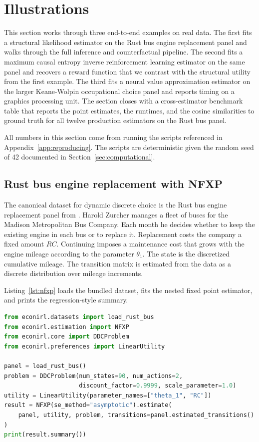 \section{Illustrations} \label{sec:illustrations}

This section works through three end-to-end examples on real data. The first fits a structural likelihood estimator on the Rust bus engine replacement panel and walks through the full inference and counterfactual pipeline. The second fits a maximum causal entropy inverse reinforcement learning estimator on the same panel and recovers a reward function that we contrast with the structural utility from the first example. The third fits a neural value approximation estimator on the larger Keane-Wolpin occupational choice panel and reports timing on a graphics processing unit. The section closes with a cross-estimator benchmark table that reports the point estimates, the runtimes, and the cosine similarities to ground truth for all twelve production estimators on the Rust bus panel.

All numbers in this section come from running the scripts referenced in Appendix~\ref{app:reproducing}. The scripts are deterministic given the random seed of 42 documented in Section~\ref{sec:computational}.

\subsection{Rust bus engine replacement with NFXP} \label{sec:illustrations:nfxp}

The canonical dataset for dynamic discrete choice is the Rust bus engine replacement panel from \citet{rust1987}. Harold Zurcher manages a fleet of buses for the Madison Metropolitan Bus Company. Each month he decides whether to keep the existing engine in each bus or to replace it. Replacement costs the company a fixed amount $RC$. Continuing imposes a maintenance cost that grows with the engine mileage according to the parameter $\theta_1$. The state is the discretized cumulative mileage. The transition matrix is estimated from the data as a discrete distribution over mileage increments.

Listing~\ref{lst:nfxp} loads the bundled dataset, fits the nested fixed point estimator, and prints the regression-style summary.

\begin{lstlisting}[caption={Fitting the nested fixed point estimator on the Rust bus panel.},label={lst:nfxp},language=Python,frame=single]
from econirl.datasets import load_rust_bus
from econirl.estimation import NFXP
from econirl.core import DDCProblem
from econirl.preferences import LinearUtility

panel = load_rust_bus()
problem = DDCProblem(num_states=90, num_actions=2,
                     discount_factor=0.9999, scale_parameter=1.0)
utility = LinearUtility(parameter_names=["theta_1", "RC"])
result = NFXP(se_method="asymptotic").estimate(
    panel, utility, problem, transitions=panel.estimated_transitions()
)
print(result.summary())
\end{lstlisting}

